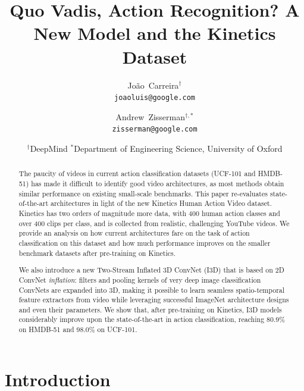 \documentclass[10pt,twocolumn,letterpaper]{article}
\begin{document}
\title{Quo Vadis, Action Recognition? A New Model and the Kinetics Dataset}


\author{Jo{\~a}o~Carreira$^\dagger$ \\
{\tt\small joaoluis@google.com}
\and
Andrew~Zisserman$^{\dagger,*}$ \\
{\tt\small zisserman@google.com}
\and
$^\dagger$DeepMind
\quad\quad\quad
$^*$Department of Engineering Science, University of Oxford\\
}

\maketitle

\begin{abstract}

The paucity of videos in current action classification datasets
(UCF-101 and HMDB-51) has made it difficult to identify good video
architectures, as most methods obtain similar performance on existing
small-scale benchmarks. This paper re-evaluates state-of-the-art
architectures in light of the new Kinetics Human Action Video 
dataset. Kinetics has two orders of magnitude
more data, with 400 human action classes and over 400 clips per class,
and is collected from
realistic, challenging YouTube videos. We provide an analysis on how
current architectures fare on the task of action classification on
this dataset and how much performance improves on the smaller 
benchmark datasets
after pre-training on Kinetics.

We also introduce a new Two-Stream Inflated 3D ConvNet (I3D) that is
based on 2D ConvNet \textit{inflation}: filters and pooling kernels of
very deep image classification ConvNets are expanded into 3D, making
it possible to learn seamless spatio-temporal feature extractors from
video while leveraging successful ImageNet architecture designs and
even their parameters. We show that, after pre-training on Kinetics,
I3D models considerably improve upon the state-of-the-art in action
classification, reaching 80.9\% on HMDB-51 and 98.0\% on UCF-101.
\end{abstract}

\section{Introduction}
\end{document}
